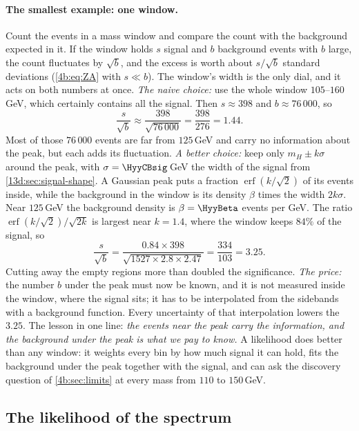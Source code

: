 \paragraph{The smallest example: one window.}
Count the events in a mass window and compare the count with the background expected in
it. If the window holds $s$ signal and $b$ background events with $b$ large, the count
fluctuates by $\sqrt b$, and the excess is worth about $s/\sqrt b$ standard deviations
(\cref{4b:eq:ZA} with $s\ll b$). The window's width is the only dial, and it acts on both
numbers at once. \emph{The naive choice:} use the whole window $105$--$160\,$GeV, which
certainly contains all the signal. Then $s\approx398$ and $b\approx76\,000$, so
\[
  \frac{s}{\sqrt b}\approx\frac{398}{\sqrt{76\,000}}=\frac{398}{276}=1.44 .
\]
Most of those $76\,000$ events are far from $125\,$GeV and carry no information about the
peak, but each adds its fluctuation. \emph{A better choice:} keep only $m_H\pm k\sigma$
around the peak, with $\sigma=\HyyCBsig\,$GeV the width of the signal from
\cref{13d:sec:signal-shape}. A Gaussian peak puts a fraction $\operatorname{erf}(k/\sqrt2)$ of
its events inside, while the background in the window is its density $\beta$ times the
width $2k\sigma$. Near $125\,$GeV the background density is $\beta=\HyyBeta$ events per
GeV. The ratio $\operatorname{erf}(k/\sqrt2)/\sqrt{2k}$ is largest near $k=1.4$, where the
window keeps $84\%$ of the signal, so
\[
  \frac{s}{\sqrt b}=\frac{0.84\times398}{\sqrt{1527\times2.8\times2.47}}
  =\frac{334}{103}=3.25 .
\]
Cutting away the empty regions more than doubled the significance. \emph{The price:} the
number $b$ under the peak must now be known, and it is not measured inside the window,
where the signal sits; it has to be interpolated from the sidebands with a background
function. Every uncertainty of that interpolation lowers the $3.25$. The lesson in one
line: \emph{the events near the peak carry the information, and the background under the
peak is what we pay to know.} A likelihood does better than any window: it weights every bin by how much signal it can hold, fits the background under the peak
together with the signal, and can ask the discovery question of \cref{4b:sec:limits} at
every mass from $110$ to $150\,$GeV.

\subsection{The likelihood of the spectrum}
\label{13d:sec:likelihood}

